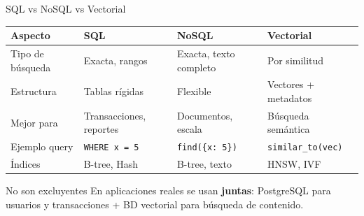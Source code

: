 \documentclass[aspectratio=169]{beamer}
\begin{document}
\begin{frame}{SQL vs NoSQL vs Vectorial}
    \begin{table}[]
        \centering
        \renewcommand{\arraystretch}{1.3}
        \scriptsize
        \begin{tabular}{p{2.5cm} p{3.5cm} p{3.5cm} p{3.5cm}}
            \toprule
            \textbf{Aspecto} & \textbf{SQL} & \textbf{NoSQL} & \textbf{Vectorial} \\
            \midrule
            Tipo de búsqueda & Exacta, rangos & Exacta, texto completo & Por similitud \\
            Estructura & Tablas rígidas & Flexible & Vectores + metadatos \\
            Mejor para & Transacciones, reportes & Documentos, escala & Búsqueda semántica \\
            Ejemplo query & \texttt{WHERE x = 5} & \texttt{find(\{x: 5\})} & \texttt{similar\_to(vec)} \\
            Índices & B-tree, Hash & B-tree, texto & HNSW, IVF \\
            \bottomrule
        \end{tabular}
    \end{table}
    
    \vspace{0.3cm}
    \begin{exampleblock}{No son excluyentes}
        En aplicaciones reales se usan \textbf{juntas}: PostgreSQL para usuarios y transacciones + BD vectorial para búsqueda de contenido.
    \end{exampleblock}
\end{frame}
\end{document}
